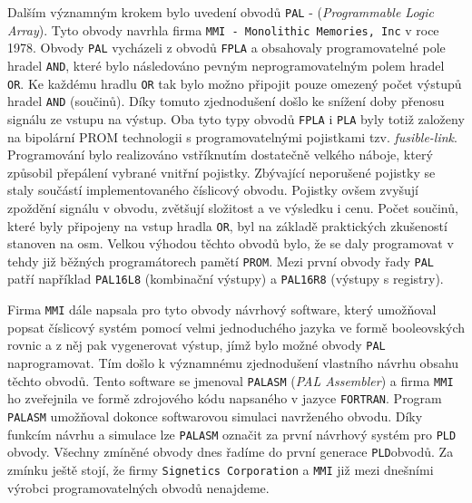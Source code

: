       Dalším významným krokem bylo uvedení obvodů \texttt{PAL} - (\emph{Programmable Logic Array}).
      Tyto obvody navrhla firma \texttt{MMI - Monolithic Memories, Inc} v roce 1978. Obvody
      \texttt{PAL} vycházeli z obvodů \texttt{FPLA} a obsahovaly programovatelné pole hradel
      \texttt{AND}, které bylo následováno pevným neprogramovatelným polem hradel \texttt{OR}. Ke
      každému hradlu \texttt{OR} tak bylo možno připojit pouze omezený počet výstupů hradel
      \texttt{AND} (součinů). Díky tomuto zjednodušení došlo ke snížení doby přenosu signálu ze
      vstupu na výstup. Oba tyto typy obvodů \texttt{FPLA} i \texttt{PLA} byly totiž založeny na
      bipolární PROM technologii s programovatelnými pojistkami tzv. \emph{fusible-link}.
      Programování bylo realizováno vstříknutím dostatečně velkého náboje, který způsobil přepálení
      vybrané vnitřní pojistky. Zbývající neporušené pojistky se staly součástí implementovaného
      číslicový obvodu. Pojistky ovšem zvyšují zpoždění signálu v obvodu, zvětšují složitost a ve
      výsledku i cenu. Počet součinů, které byly připojeny na vstup hradla \texttt{OR}, byl na
      základě praktických zkušeností stanoven na osm. Velkou výhodou těchto obvodů bylo, že se daly
      programovat v tehdy již běžných programátorech pamětí \texttt{PROM}. Mezi první obvody řady
      \texttt{PAL} patří například \texttt{PAL16L8} (kombinační výstupy) a \texttt{PAL16R8}
      (výstupy s registry).
      
      Firma \texttt{MMI} dále napsala pro tyto obvody návrhový software, který umožňoval popsat
      číslicový systém pomocí velmi jednoduchého jazyka ve formě booleovských rovnic a z něj pak
      vygenerovat výstup, jímž bylo možné obvody \texttt{PAL} naprogramovat. Tím došlo k významnému
      zjednodušení vlastního návrhu obsahu těchto obvodů. Tento software se jmenoval
      \texttt{PALASM} (\emph{PAL Assembler}) a firma \texttt{MMI} ho zveřejnila ve formě zdrojového
      kódu napsaného v jazyce \texttt{FORTRAN}. Program \texttt{PALASM} umožňoval dokon\-ce
      softwarovou simulaci navrženého obvodu. Díky funkcím návrhu a simulace  lze \texttt{PALASM}
      označit za první návrhový systém pro \texttt{PLD} obvody. Všechny zmíněné obvody dnes řadíme
      do první generace \texttt{PLD}obvodů. Za zmínku ještě stojí, že firmy \texttt{Signetics
      Corporation} a \texttt{MMI} již mezi dnešními výrobci programovatelných obvodů nenajdeme.
      
